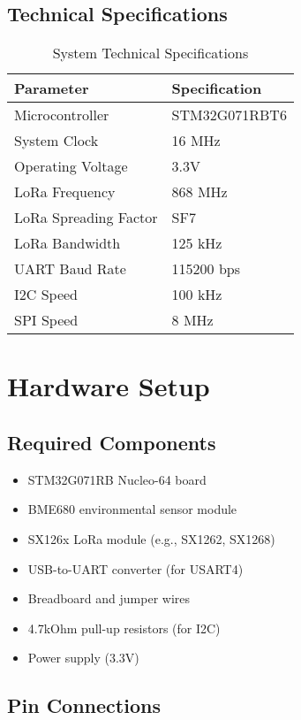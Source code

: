 \documentclass[11pt,a4paper]{article}
\begin{document}
\subsection{Technical Specifications}
\begin{table}[h]
\centering
\begin{tabular}{|l|l|}
\hline
\textbf{Parameter} & \textbf{Specification} \\
\hline
Microcontroller & STM32G071RBT6 \\
\hline
System Clock & 16 MHz \\
\hline
Operating Voltage & 3.3V \\
\hline
LoRa Frequency & 868 MHz \\
\hline
LoRa Spreading Factor & SF7 \\
\hline
LoRa Bandwidth & 125 kHz \\
\hline
UART Baud Rate & 115200 bps \\
\hline
I2C Speed & 100 kHz \\
\hline
SPI Speed & 8 MHz \\
\hline
\end{tabular}
\caption{System Technical Specifications}
\end{table}

\section{Hardware Setup}

\subsection{Required Components}
\begin{itemize}
    \item STM32G071RB Nucleo-64 board
    \item BME680 environmental sensor module
    \item SX126x LoRa module (e.g., SX1262, SX1268)
    \item USB-to-UART converter (for USART4)
    \item Breadboard and jumper wires
    \item 4.7kOhm pull-up resistors (for I2C)
    \item Power supply (3.3V)
\end{itemize}

\subsection{Pin Connections}
\end{document}
